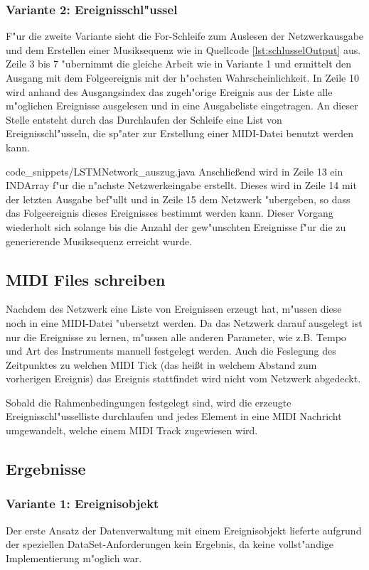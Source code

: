 {\subsubsection{Variante 2: Ereignisschl"ussel}
F"ur die zweite Variante sieht die For-Schleife zum Auslesen der Netzwerkausgabe und dem Erstellen einer Musiksequenz wie in Quellcode \ref{lst:schlusselOutput} aus. Zeile 3 bis 7 "ubernimmt die gleiche Arbeit wie in Variante 1 und ermittelt den Ausgang mit dem Folgeereignis mit der h"ochsten Wahrscheinlichkeit. In Zeile 10 wird anhand des Ausgangsindex das zugeh"orige Ereignis aus der Liste alle m"oglichen Ereignisse ausgelesen und in eine Ausgabeliste eingetragen. An dieser Stelle entsteht durch das Durchlaufen der Schleife eine List von Ereignisschl"usseln, die sp"ater zur Erstellung einer MIDI-Datei benutzt werden kann.

{code_snippets/LSTMNetwork_auszug.java}
Anschlie{\ss}end wird in Zeile 13 ein INDArray  f"ur die n"achste Netzwerkeingabe erstellt. Dieses wird in Zeile 14 mit der letzten Ausgabe bef"ullt und in Zeile 15 dem Netzwerk "ubergeben, so dass das Folgeereignis dieses Ereignisses bestimmt werden kann. Dieser Vorgang wiederholt sich solange bis die Anzahl der gew"unschten Ereignisse f"ur die zu generierende Musiksequenz erreicht wurde.

\subsection{MIDI Files schreiben}
Nachdem des Netzwerk eine Liste von Ereignissen erzeugt hat, m"ussen diese noch in eine MIDI-Datei "ubersetzt werden. Da das Netzwerk darauf ausgelegt ist nur die Ereignisse zu lernen, m"ussen alle anderen Parameter, wie z.B. Tempo und Art des Instruments manuell festgelegt werden. Auch die Feslegung des Zeitpunktes zu welchen MIDI Tick (das hei{\ss}t in welchem Abstand zum vorherigen Ereignis) das Ereignis stattfindet wird nicht vom Netzwerk abgedeckt.

Sobald die Rahmenbedingungen festgelegt sind, wird die erzeugte Ereignisschl"usselliste durchlaufen und jedes Element in eine MIDI Nachricht umgewandelt, welche einem MIDI Track zugewiesen wird.


\subsection{Ergebnisse}
\subsubsection{Variante 1: Ereignisobjekt}
Der erste Ansatz der Datenverwaltung mit einem Ereignisobjekt lieferte aufgrund der speziellen DataSet-Anforderungen kein Ergebnis, da keine vollst"andige Implementierung m"oglich war.

}
